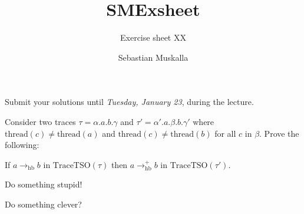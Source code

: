 \documentclass
[
    folder=../style,
    a4paper,
    12pt,
    parskip=half-,
    numbers=enddot,
    fleqn,
]{../style/smexsheet}
\title{SMExsheet}
\subtitle{Exercise sheet XX}
\author{Sebastian Muskalla}
\begin{document}
\maketitle

\begin{center}
    Submit your solutions until \emph{Tuesday, January 23}, during the lecture.
\end{center}


\begin{exercise}
	Consider two traces $\tau = \alpha.a.b.\gamma$ and $\tau' = \alpha'.a.\beta.b.\gamma'$
	where $\text{thread}(c) \neq \text{thread}(a)$
	and $\text{thread}(c) \neq \text{thread}(b)$ for all $c$ in $\beta$.
	Prove the following:
	\begin{center}
		If $a\rightarrow_{\text{hb}} b$ in $\text{TraceTSO}(\tau)$ then  $a\rightarrow_{\text{hb}}^+ b$ in $\text{TraceTSO}(\tau')$.
	\end{center}
\end{exercise}

\begin{exercise*}
	Do something stupid!
\end{exercise*}

\begin{exercise}
	Do something clever?
\end{exercise}
\end{document}
